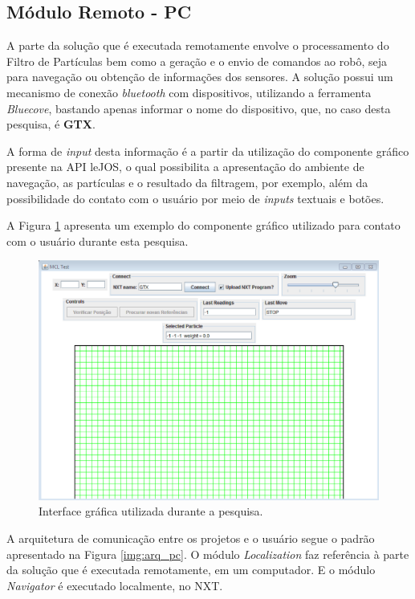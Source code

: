 	\subsection{Módulo Remoto - PC}

		A parte da solução que é executada remotamente envolve o processamento do Filtro de Partículas bem como a geração e o envio de comandos ao robô, seja para navegação
		ou obtenção de informações dos sensores. A solução possui um mecanismo de conexão \textit{bluetooth} com dispositivos, utilizando a ferramenta
		\textit{Bluecove}, bastando apenas informar o nome do dispositivo, que, no caso desta pesquisa, é \textbf{GTX}.

		A forma de \textit{input} desta informação é a partir da utilização do componente gráfico presente na API leJOS, o qual possibilita a apresentação do ambiente de navegação,
		as partículas e o resultado da filtragem, por exemplo, além da possibilidade do contato com o usuário por meio de \textit{inputs} textuais e botões.

		A Figura \ref{img:frame_pc} apresenta um exemplo do componente gráfico utilizado para contato com o usuário durante esta pesquisa.

		\begin{figure}[H]
			\centering
			\includegraphics[scale=0.7]{figuras/frame.eps}
			\caption[Interface Gráfica]{Interface gráfica utilizada durante a pesquisa.}
			\label{img:frame_pc}
		\end{figure}

	A arquitetura de comunicação entre os projetos e o usuário segue o padrão apresentado na Figura \ref{img:arq_pc}. O módulo \textit{Localization}
	faz referência à parte da solução que é executada remotamente, em um computador. E o módulo \textit{Navigator} é executado localmente, no NXT.

